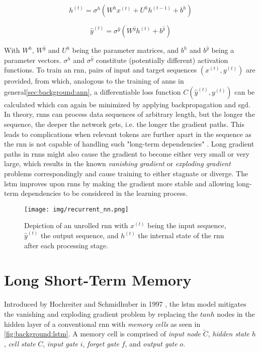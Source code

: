 \begin{equation}
h^{(t)} = \sigma^h (W^h x^{(t)} + U^h h^{(t-1)} + b^h)
\end{equation}

\begin{equation}
\hat{y}^{(t)} = \sigma^{\hat{y}} (W^{\hat{y}} h^{(t)} + b^{\hat{y}})
\end{equation}

With $W^h$, $W^{\hat{y}}$ and $U^h$ being the parameter matrices, and $b^h$ and $b^{\hat{y}}$ being a parameter vectors. $\sigma^h$ and $\sigma^{\hat{y}}$ constitute (potentially different) activation functions.
To train an \gls{rnn}, pairs of input and target sequences $(x^{(t)}, y^{(t)})$ are provided, from which, analogous to the training of \glspl{ann} in general\ref{sec:background:ann}, a differentiable loss function $C(\hat{y}^{(t)}, y^{(t)})$ can be calculated which can again be minimized by applying backpropagation and \gls{sgd}. In theory, \glspl{rnn} can process data sequences of arbitrary length, but the longer the sequence, the deeper the network gets, i.e. the longer the gradient paths. This leads to complications when relevant tokens are further apart in the sequence as the \gls{rnn} is not capable of handling such "long-term dependencies" \cite{rnn_review}. Long gradient paths in \glspl{rnn} might also cause the gradient to become either very small or very large, which results in the known \textit{vanishing gradient} or \textit{exploding gradient} problems correspondingly and cause training to either stagnate or diverge. The \gls{lstm} improves upon \glspl{rnn} by making the gradient more stable and allowing long-term dependencies to be considered in the learning process.

\begin{figure}[h]
	\centering
	\texttt{[image: img/recurrent\_nn.png]}
	\caption{Depiction of an unrolled \gls{rnn} with $x^{(t)}$ being the input sequence, $\hat{y}^{(t)}$ the output sequence, and $h^{(t)}$ the internal state of the \gls{rnn} after each processing stage.}
	\label{fig:background:rnn}
\end{figure}

\section{Long Short-Term Memory}

Introduced by Hochreiter and Schmidhuber in 1997 \cite{lstm_origin}, the \gls{lstm} model mitigates the vanishing and exploding gradient problem by replacing the $tanh$ nodes in the hidden layer of a conventional \gls{rnn} with \textit{memory cells} as seen in \ref{fig:background:lstm}. 
A memory cell is comprised of \textit{input node} $\tilde{C}$, \textit{hidden state} $h$, \textit{cell state} $C$, \textit{input gate} $i$, \textit{forget gate} $f$, and \textit{output gate} $o$. 

